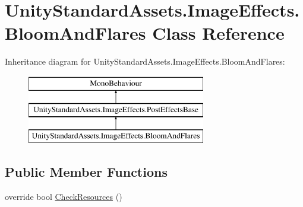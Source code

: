 \hypertarget{class_unity_standard_assets_1_1_image_effects_1_1_bloom_and_flares}{}\section{Unity\+Standard\+Assets.\+Image\+Effects.\+Bloom\+And\+Flares Class Reference}
\label{class_unity_standard_assets_1_1_image_effects_1_1_bloom_and_flares}
Inheritance diagram for Unity\+Standard\+Assets.\+Image\+Effects.\+Bloom\+And\+Flares\+:\begin{figure}[H]
\begin{center}
\leavevmode
\includegraphics[height=3.000000cm]{class_unity_standard_assets_1_1_image_effects_1_1_bloom_and_flares}
\end{center}
\end{figure}
\subsection*{Public Member Functions}
\begin{DoxyCompactItemize}
\item 
override bool \mbox{\hyperlink{class_unity_standard_assets_1_1_image_effects_1_1_bloom_and_flares_a5f5645224068a6a5273f3617bbd73c63}{Check\+Resources}} ()
\end{DoxyCompactItemize}
